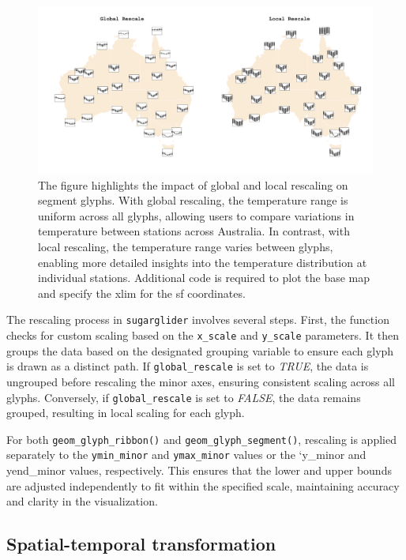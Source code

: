 \begin{figure}

{\centering \includegraphics[width=1\linewidth]{figures/global_rescale} 

}

\caption{The figure highlights the impact of global and local rescaling on segment glyphs. With global rescaling, the temperature range is uniform across all glyphs, allowing users to compare variations in temperature between stations across Australia. In contrast, with local rescaling, the temperature range varies between glyphs, enabling more detailed insights into the temperature distribution at individual stations. Additional code is required to plot the base map and specify the xlim for the sf coordinates.}\label{fig:unnamed-chunk-6}
\end{figure}

The rescaling process in \texttt{sugarglider} involves several steps. First, the function checks for custom scaling based on the \texttt{x\_scale} and \texttt{y\_scale} parameters. It then groups the data based on the designated grouping variable to ensure each glyph is drawn as a distinct path. If \texttt{global\_rescale} is set to \emph{TRUE}, the data is ungrouped before rescaling the minor axes, ensuring consistent scaling across all glyphs. Conversely, if \texttt{global\_rescale} is set to \emph{FALSE}, the data remains grouped, resulting in local scaling for each glyph.

For both \texttt{geom\_glyph\_ribbon()} and \texttt{geom\_glyph\_segment()}, rescaling is applied separately to the \texttt{ymin\_minor} and \texttt{ymax\_minor} values or the `y\_minor and yend\_minor values, respectively. This ensures that the lower and upper bounds are adjusted independently to fit within the specified scale, maintaining accuracy and clarity in the visualization.

\hypertarget{spatial-temporal-transformation}{%
\subsection{Spatial-temporal transformation}\label{spatial-temporal-transformation}}

